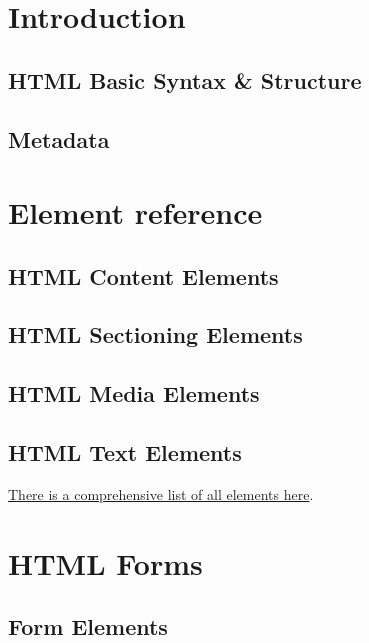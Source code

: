 \documentclass[b5paper,openany]{book}
\begin{document}
\tp


\tableofcontents



\chapter{Introduction}

\section{HTML Basic Syntax \& Structure}


\section{Metadata}
%


\chapter{Element reference}

\section{HTML Content Elements}
%

\section{HTML Sectioning Elements}
%

\section{HTML Media Elements}
%

\section{HTML Text Elements}
%

\href{https://developer.mozilla.org/en-US/docs/Web/HTML/Element}{There is a comprehensive list of all elements here}.


\chapter{HTML Forms}

\section{Form Elements}
%




\end{document}
